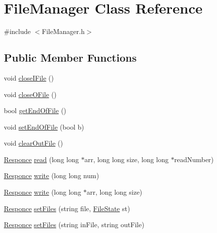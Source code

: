 \hypertarget{class_file_manager}{}\section{File\+Manager Class Reference}
\label{class_file_manager}


{\ttfamily \#include $<$File\+Manager.\+h$>$}

\subsection*{Public Member Functions}
\begin{DoxyCompactItemize}
\item 
void \hyperlink{class_file_manager_a4a4719a410ca31985e8b75ad75485ce6}{close\+I\+File} ()
\item 
void \hyperlink{class_file_manager_a6a1f1ddbf047fc7e9531f483e4c62148}{close\+O\+File} ()
\item 
bool \hyperlink{class_file_manager_a49df99509ff2700e0e5edd06adca345c}{get\+End\+Of\+File} ()
\item 
void \hyperlink{class_file_manager_ace8ce2677414831b5a9e7030248fc832}{set\+End\+Of\+File} (bool b)
\item 
void \hyperlink{class_file_manager_a2f1102abfd0a5a9d7e178968a3fdc56c}{clear\+Out\+File} ()
\item 
\hyperlink{_structures_8h_a9864d6ef28dd6e38416afac4426b3491}{Responce} \hyperlink{class_file_manager_aba031d681752c80f52a8a8af9b69834e}{read} (long long $\ast$arr, long long size, long long $\ast$read\+Number)
\item 
\hyperlink{_structures_8h_a9864d6ef28dd6e38416afac4426b3491}{Responce} \hyperlink{class_file_manager_a77cb9ec2885923dd6b7a9674cb75f85f}{write} (long long num)
\item 
\hyperlink{_structures_8h_a9864d6ef28dd6e38416afac4426b3491}{Responce} \hyperlink{class_file_manager_ad4c96727180b0055942d20b7b5bfe5f8}{write} (long long $\ast$arr, long long size)
\item 
\hyperlink{_structures_8h_a9864d6ef28dd6e38416afac4426b3491}{Responce} \hyperlink{class_file_manager_ab364b91193c482fc7387aec162f677ad}{set\+Files} (string file, \hyperlink{_structures_8h_a57306ae0f9e356347388234ed69e0ce7}{File\+State} st)
\item 
\hyperlink{_structures_8h_a9864d6ef28dd6e38416afac4426b3491}{Responce} \hyperlink{class_file_manager_a975bf0088fa67c83d78ec54b9f61a473}{set\+Files} (string in\+File, string out\+File)
\item 

\end{DoxyCompactItemize}
